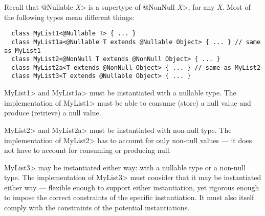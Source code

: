 %
%
%
%



Recall that \<@Nullable \emph{X}> is a supertype of \<@NonNull \emph{X}>,
for any \emph{X}\@.
Most of the following types mean different things:

\begin{Verbatim}
  class MyList1<@Nullable T> { ... }
  class MyList1a<@Nullable T extends @Nullable Object> { ... } // same as MyList1
  class MyList2<@NonNull T extends @NonNull Object> { ... }
  class MyList2a<T extends @NonNull Object> { ... } // same as MyList2
  class MyList3<T extends @Nullable Object> { ... }
\end{Verbatim}

\<MyList1> and \<MyList1a> must be instantiated with a nullable type.
The implementation of \<MyList1> must be able to consume (store) a null
value and produce (retrieve) a null value.

\<MyList2> and \<MyList2a> must be instantiated with non-null type.
The implementation of \<MyList2> has to account for only non-null values --- it
does not have to account for consuming or producing null.

\<MyList3> may be instantiated either way:
with a nullable type or a non-null type.  The implementation of \<MyList3> must consider
that it may be instantiated either way --- flexible enough to support either
instantiation, yet rigorous enough to impose the correct constraints of the
specific instantiation.  It must also itself comply with the constraints of
the potential instantiations.

